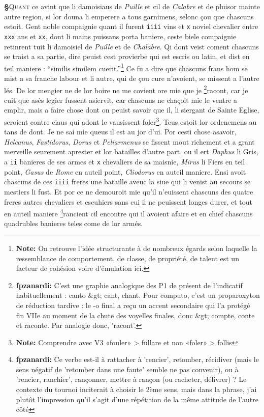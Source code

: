 \documentclass[12pt]{article} %
\newcommand{\colmar}[1]{\marginnote{[#1]}}          %
\newcommand{\persName}[1]{\emph{#1}} %
\newcommand{\placeName}[1]{\emph{#1}} %
\newcommand{\num}[1]{\texttt{#1}}    %
\newcommand{\supplied}[1]{\textlangle#1\textrangle} %
\newcommand{\fnnote}[1]{\footnote{\textbf{Note:} #1}} %
\newcommand{\fnfpz}[1]{\footnote{\textbf{fpzanardi:} #1}} %
\newcounter{paranum}
\newcommand{\pnum}{\stepcounter{paranum}\textbf{§\arabic{paranum}}\quad}
\begin{document}
\pnum \lettrine[lines=2]{\color{darkblue}Q}{uant} ce avint que li damoisiaus de \placeName{Puille} et cil de \placeName{Calabre} et de pluisor mai\supplied{n}te autre region, si lor douna li emperere \colmar{6rb}\colmar{b} a tous garnimens, selonc çou que chascuns estoit. Gent noble compaignie quant il furent \num{iiii} vins et \num{x} noviel chevalier entre \num{xxx} ans et \num{xx}, dont li mains puissans porta baniere, ceste biele compaignie retinrent tuit li damoisiel de \placeName{Puille} et de \placeName{Chalabre}. Qi dont veist coment chascuns se traist a sa partie, dire peuist cest provierbe qui est escris ou latin, et dist en teil maniere : ``similis similem cuerit.''\fnnote{On retrouve l'idée structurante à de nombreux égards selon laquelle la ressemblance de comportement, de classe, de propriété, de talent est un facteur de cohésion voire d'émulation ici.} Ce fu a dire que chascuns frans hom se mist a sa franche labour et li autre, qui de çou cure n'avoient, se missent a l'autre lés. De lor mengier ne de lor boire ne me covient ore mie que je \fnfpz{C'est une graphie analogique des P1 de présent de l'indicatif habituellement : canto &gt; cant, chant. Pour computo, c'est un proparoxyton de réduction tardive : le -o final a reçu un accent secondaire qui l'a protégé fin VIIe au moment de la chute des voyelles finales, donc &gt; compte, conte et raconte. Par analogie donc, 'racont'.}racont, car je cuit que asés legier fussent asiervit, car chascuns ne chaçoit mie le ventre a emplir, mais a faire chose dont on peuist savoir que il, li siergant de Sainte Eglise, seroient contre ciaus qui adont le vausissent foler\fnnote{Comprendre avec V3 «fouler» > fullare et non «foler» > follis }. Teus estoit lor ordenemens au tans de dont. Je ne sai mie queus il est au jor d'ui. Por cesti chose asavoir, \persName{Helcanus}, \persName{Fastidorus}, \persName{Dorus} et \persName{Peliarmenus} se fissent mout richement et a g\supplied{ra}nt merveille seurement aprester et lor batailles d'autre part, ou il ert \persName{Daphus} li Gris, a \num{ii} banieres de ses armes et \num{x} chevaliers de sa maisnie, \persName{Mirus} li Fiers en teil point, \persName{Gasus} de \placeName{Rome} en auteil point, \persName{Cliodorus} en auteil maniere. Ensi avoit chascuns de ces \num{iiii} freres une bataille aveuc la siue qui li venist au secours se mestiers li fust. Et por ce ne demouroit mie qu'il n'euissent chascuns des quatre freres autres chevaliers et escuhiers sans cui il ne peuissent longes durer, et tout en auteil maniere \fnfpz{Ce verbe est-il à rattacher à 'rencier', retomber, récidiver (mais le sens négatif de 'retomber dans une faute' semble ne pas convenir), ou à 'rencier, ranchier', rançonner, mettre à rançon (ou racheter, délivrer) ? Le contexte du tournoi inciterait à choisir le 2ème sens, mais dans la phrase, j'ai plutôt l'impression qu'il s'agit d'une répétition de la même attitude de l'autre côté}rancient cil encontre qui il avoient afaire et en chief chascuns quadrubles banieres teles come de lor armés.
\end{document}

